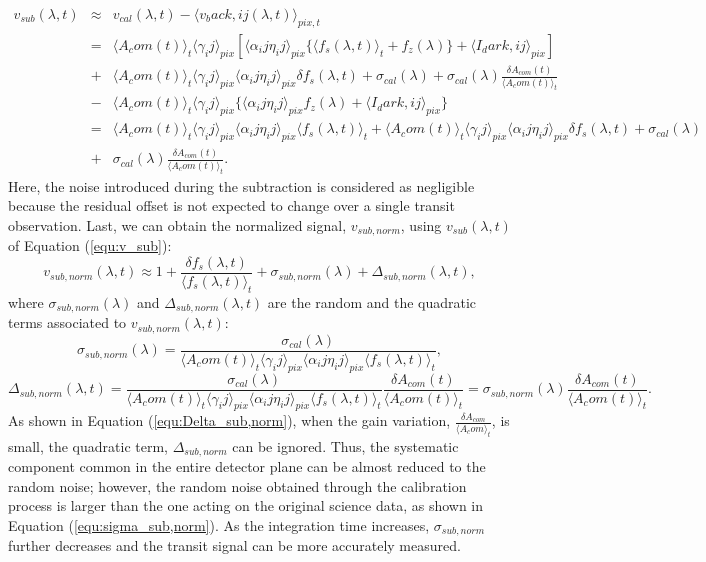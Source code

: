 \documentclass{aastex62}
\def\hoge<#1>{\langle #1 \rangle}
\begin{document}
\begin{eqnarray}
\label{equ:v_sub}
v_{sub}(\lambda,t) &\approx& v_{cal}(\lambda,t)-\hoge<v_{back,ij}(\lambda,t)>_{pix,t} \nonumber \\
&=& \hoge<A_{com}(t)>_{t}\hoge<\gamma_{ij}>_{pix}[\hoge<\alpha_{ij}\eta_{ij}>_{pix}\{\hoge<f_{s}(\lambda,t)>_{t}+f_{z}(\lambda)\}+\hoge<I_{dark,ij}>_{pix}] \nonumber \\
&+& \hoge<A_{com}(t)>_{t}\hoge<\gamma_{ij}>_{pix}\hoge<\alpha_{ij}\eta_{ij}>_{pix}{\delta}f_{s}(\lambda,t)+\sigma_{cal}(\lambda)+\sigma_{cal}(\lambda)\frac{{\delta}A_{com}(t)}{\hoge<A_{com}(t)>_{t}} \nonumber \\
&-& \hoge<A_{com}(t)>_{t}\hoge<\gamma_{ij}>_{pix}\{\hoge<\alpha_{ij}\eta_{ij}>_{pix}f_{z}(\lambda)+\hoge<I_{dark,ij}>_{pix}\} \nonumber \\
&=& \hoge<A_{com}(t)>_{t}\hoge<\gamma_{ij}>_{pix}\hoge<\alpha_{ij}\eta_{ij}>_{pix}\hoge<f_{s}(\lambda,t)>_{t}+\hoge<A_{com}(t)>_{t}\hoge<\gamma_{ij}>_{pix}\hoge<\alpha_{ij}\eta_{ij}>_{pix}{\delta}f_{s}(\lambda,t)+\sigma_{cal}(\lambda) \nonumber \\
&+& \sigma_{cal}(\lambda)\frac{{\delta}A_{com}(t)}{\hoge<A_{com}(t)>_{t}} .
\end{eqnarray}
Here, the noise introduced during the subtraction is considered as negligible because the residual offset is not expected to change over a single transit observation. Last, we can obtain the normalized signal, $v_{sub,norm}$, using $v_{sub}(\lambda,t)$ of Equation (\ref{equ:v_sub}):
\begin{equation}
\label{equ:v_sub,norm}
v_{sub,norm}(\lambda,t) \approx 1+\frac{{\delta}f_{s}(\lambda,t)}{\hoge<f_{s}(\lambda,t)>_{t}}+\sigma_{sub,norm}(\lambda)+\Delta_{sub,norm}(\lambda,t) ,
\end{equation}
where $\sigma_{sub,norm}(\lambda)$ and $\Delta_{sub,norm}(\lambda,t)$ are the random and the quadratic terms associated to $v_{sub,norm}(\lambda,t)$:
\begin{equation}
\label{equ:sigma_sub,norm}
\sigma_{sub,norm}(\lambda) = \frac{\sigma_{cal}(\lambda)}{\hoge<A_{com}(t)>_{t}\hoge<\gamma_{ij}>_{pix}\hoge<\alpha_{ij}\eta_{ij}>_{pix}\hoge<f_{s}(\lambda,t)>_{t}} ,
\end{equation}
\begin{equation}
\label{equ:Delta_sub,norm}
\Delta_{sub,norm}(\lambda,t) = \frac{\sigma_{cal}(\lambda)}{\hoge<A_{com}(t)>_{t}\hoge<\gamma_{ij}>_{pix}\hoge<\alpha_{ij}\eta_{ij}>_{pix}\hoge<f_{s}(\lambda,t)>_{t}}\frac{{\delta}A_{com}(t)}{\hoge<A_{com}(t)>_{t}} = \sigma_{sub,norm}(\lambda)\frac{{\delta}A_{com}(t)}{\hoge<A_{com}(t)>_{t}} .
\end{equation}
As shown in Equation (\ref{equ:Delta_sub,norm}), when the gain variation, $\frac{{\delta}A_{com}}{\hoge<A_{com}>_t}$, is small, the quadratic term, $\Delta_{sub,norm}$ can be ignored. Thus, the systematic component common in the entire detector plane can be almost reduced to the random noise; however, the random noise obtained through the calibration process is larger than the one acting on the original science data, as shown in Equation (\ref{equ:sigma_sub,norm}). As the integration time increases, $\sigma_{sub,norm}$ further decreases and the transit signal can be more accurately measured.
\end{document}

